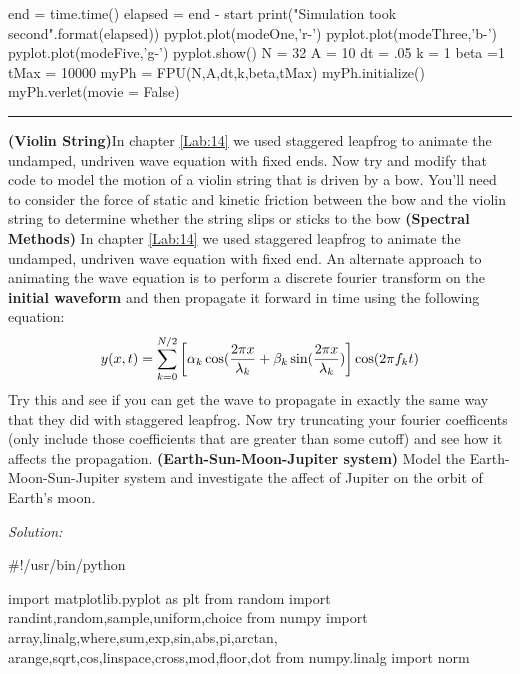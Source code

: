 \begin{enumerate}
\begin{codeexample}
\begin{VerbatimOut}{\listingFile}
        end = time.time()
        elapsed = end - start
        print("Simulation took {} second".format(elapsed))
        pyplot.plot(modeOne,'r-')
        pyplot.plot(modeThree,'b-')
        pyplot.plot(modeFive,'g-')
        pyplot.show()
N = 32
A = 10
dt = .05
k = 1
beta =1
tMax = 10000
myPh = FPU(N,A,dt,k,beta,tMax)
myPh.initialize()
myPh.verlet(movie = False)


\end{VerbatimOut}
\end{codeexample}
\else
\noindent\rule{5 in}{0.01 in}
\fi

\prob \textbf{(Violin String)}In chapter \ref{Lab:14} we used staggered leapfrog to animate
the undamped, undriven wave equation with fixed ends.  Now try and
modify that code to model the motion of a violin string that is driven
by a bow.  You'll need to consider the force of static and kinetic
friction between the bow and the violin string to determine whether
the string slips or sticks to the bow
\prob \textbf{(Spectral Methods)}  In chapter \ref{Lab:14} we used
staggered leapfrog to animate the undamped, undriven wave equation
with fixed end.  An alternate approach to animating the wave equation
is to perform a discrete fourier transform on the \textbf{initial
  waveform} and then propagate it forward in time using the following
equation:
\begin{equation}
y(x,t) = \sum_{k=0}^{N/2} \left[ \alpha_k \cos({2 \pi x\over
    \lambda_k} + \beta_k \sin({2 \pi x\over \lambda_k} )\right]
\cos(2\pi f_k t)
\end{equation}
Try this and see if you can get the wave to propagate in exactly the
same way that they did with staggered leapfrog.  Now try truncating
your fourier coefficents (only include those coefficients that are
greater than some cutoff) and see how it affects the propagation.  
\prob \textbf{(Earth-Sun-Moon-Jupiter system)}  Model the
Earth-Moon-Sun-Jupiter system and investigate the affect of Jupiter on
the orbit of Earth's moon.

\ifsolutions
\textit{Solution:}\\
\begin{codeexample}
\begin{VerbatimOut}{\listingFile}
#!/usr/bin/python

import matplotlib.pyplot as plt
from random import randint,random,sample,uniform,choice
from numpy import array,linalg,where,sum,exp,sin,abs,pi,arctan, arange,sqrt,cos,linspace,cross,mod,floor,dot
from numpy.linalg import norm




\end{VerbatimOut}
\end{codeexample}
\end{enumerate}
